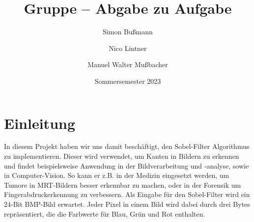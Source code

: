 \documentclass[course=erap]{aspdoc}
\author{Simon Bußmann \and Nico Lintner \and Manuel Walter Mußbacher}
\date{Sommersemester 2023}
\title{Gruppe \theGroup{} -- Abgabe zu Aufgabe \theNumber}
\begin{document}
\maketitle

\section{Einleitung}
\label{sec:einleitung}
In diesem Projekt haben wir uns damit beschäftigt, den Sobel-Filter Algorithmus zu implementieren.
Dieser wird verwendet, um Kanten in Bildern zu erkennen und findet beispielsweise Anwendung in der Bildverarbeitung und -analyse, sowie in Computer-Vision.
So kann er z.B. in der Medizin eingesetzt werden, um Tumore in MRT-Bildern besser erkennbar zu machen\cite{7002427},
oder in der Forensik um Fingerabdruckerkennung zu verbessern\cite{6900702}.
Als Eingabe für den Sobel-Filter wird ein 24-Bit BMP-Bild erwartet.
Jeder Pixel in einem Bild wird dabei durch drei Bytes repräsentiert, die die Farbwerte für Blau, Grün und Rot enthalten.
\end{document}
